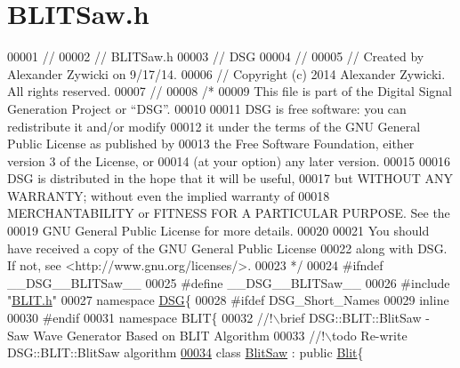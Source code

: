 \hypertarget{_b_l_i_t_saw_8h_source}{\section{B\+L\+I\+T\+Saw.\+h}
\label{_b_l_i_t_saw_8h_source}
}

\begin{DoxyCode}
00001 \textcolor{comment}{//}
00002 \textcolor{comment}{//  BLITSaw.h}
00003 \textcolor{comment}{//  DSG}
00004 \textcolor{comment}{//}
00005 \textcolor{comment}{//  Created by Alexander Zywicki on 9/17/14.}
00006 \textcolor{comment}{//  Copyright (c) 2014 Alexander Zywicki. All rights reserved.}
00007 \textcolor{comment}{//}
00008 \textcolor{comment}{/*}
00009 \textcolor{comment}{ This file is part of the Digital Signal Generation Project or “DSG”.}
00010 \textcolor{comment}{}
00011 \textcolor{comment}{ DSG is free software: you can redistribute it and/or modify}
00012 \textcolor{comment}{ it under the terms of the GNU General Public License as published by}
00013 \textcolor{comment}{ the Free Software Foundation, either version 3 of the License, or}
00014 \textcolor{comment}{ (at your option) any later version.}
00015 \textcolor{comment}{}
00016 \textcolor{comment}{ DSG is distributed in the hope that it will be useful,}
00017 \textcolor{comment}{ but WITHOUT ANY WARRANTY; without even the implied warranty of}
00018 \textcolor{comment}{ MERCHANTABILITY or FITNESS FOR A PARTICULAR PURPOSE.  See the}
00019 \textcolor{comment}{ GNU General Public License for more details.}
00020 \textcolor{comment}{}
00021 \textcolor{comment}{ You should have received a copy of the GNU General Public License}
00022 \textcolor{comment}{ along with DSG.  If not, see <http://www.gnu.org/licenses/>.}
00023 \textcolor{comment}{ */}
00024 \textcolor{preprocessor}{#ifndef \_\_DSG\_\_BLITSaw\_\_}
00025 \textcolor{preprocessor}{#define \_\_DSG\_\_BLITSaw\_\_}
00026 \textcolor{preprocessor}{#include "\hyperlink{_b_l_i_t_8h}{BLIT.h}"}
00027 \textcolor{keyword}{namespace }\hyperlink{namespace_d_s_g}{DSG}\{
00028 \textcolor{preprocessor}{#ifdef DSG\_Short\_Names}
00029     \textcolor{keyword}{inline}
00030 \textcolor{preprocessor}{#endif}
00031     \textcolor{keyword}{namespace }BLIT\{\textcolor{comment}{}
00032 \textcolor{comment}{        //!\(\backslash\)brief DSG::BLIT::BlitSaw - Saw Wave Generator Based on BLIT Algorithm}
00033 \textcolor{comment}{        //!\(\backslash\)todo Re-write DSG::BLIT::BlitSaw algorithm}
\hypertarget{_b_l_i_t_saw_8h_source_l00034}{}\hyperlink{class_d_s_g_1_1_b_l_i_t_1_1_blit_saw}{00034} \textcolor{comment}{}        \textcolor{keyword}{class }\hyperlink{class_d_s_g_1_1_b_l_i_t_1_1_blit_saw}{BlitSaw} : \textcolor{keyword}{public} \hyperlink{class_d_s_g_1_1_b_l_i_t_1_1_blit}{Blit}\{

\end{DoxyCode}
